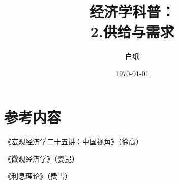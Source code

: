 \documentclass[UTF8]{article}
\title{经济学科普： \\ 2.供给与需求}
\author{白纸}
\date{\today}
\begin{document}
\maketitle

\section{参考内容}
    《宏观经济学二十五讲：中国视角》（徐高）\par
    《微观经济学》（曼昆）\par
    《利息理论》（费雪）
\end{document}
